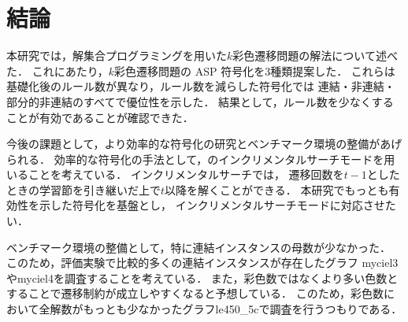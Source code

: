 \chapter{結論} \label{chap:conclusion}
本研究では，解集合プログラミングを用いた$k$彩色遷移問題の解法について述べた．
これにあたり，$k$彩色遷移問題の ASP 符号化を3種類提案した．
これらは基礎化後のルール数が異なり，ルール数を減らした符号化では
連結・非連結・部分的非連結のすべてで優位性を示した．
結果として，ルール数を少なくすることが有効であることが確認できた．

今後の課題として，より効率的な符号化の研究とベンチマーク環境の整備があげられる．
効率的な符号化の手法として，{\clingo}のインクリメンタルサーチモードを用いることを考えている．
インクリメンタルサーチでは，
遷移回数を$t-1$としたときの学習節を引き継いだ上で$t$以降を解くことができる．
本研究でもっとも有効性を示した符号化を基盤とし，
インクリメンタルサーチモードに対応させたい．

ベンチマーク環境の整備として，特に連結インスタンスの母数が少なかった．
このため，評価実験で比較的多くの連結インスタンスが存在したグラフ
myciel3やmyciel4を調査することを考えている．
また，彩色数ではなくより多い色数とすることで遷移制約が成立しやすくなると予想している．
このため，彩色数において全解数がもっとも少なかったグラフle450\_5cで調査を行うつもりである．


